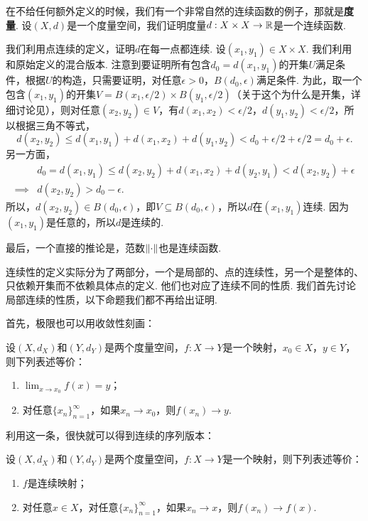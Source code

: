 \begin{example}\label{ex:metric-norm-continuous}
在不给任何额外定义的时候，我们有一个非常自然的连续函数的例子，那就是\textbf{度量}. 设$(X,d)$是一个度量空间，我们证明度量$d:X\times X\to\mathbb{R}$是一个连续函数. 

我们利用点连续的定义，证明$d$在每一点都连续. 设$(x_1,y_1)\in X\times X$. 我们利用 和原始定义的混合版本. 注意到要证明所有包含$d_0=d(x_1,y_1)$的开集$U$满足条件，根据$U$的构造，只需要证明，对任意$\epsilon>0$，$B(d_0,\epsilon)$满足条件. 为此，取一个包含$(x_1,y_1)$的开集$V=B(x_1,\epsilon/2)\times B(y_1,\epsilon/2)$（关于这个为什么是开集，详细讨论见），则对任意$(x_2,y_2)\in V$，有$d(x_1,x_2)<\epsilon/2$，$d(y_1,y_2)<\epsilon/2$，所以根据三角不等式，
\[d(x_2,y_2)\leq d(x_1,y_1)+d(x_1,x_2)+d(y_1,y_2)<d_0+\epsilon/2+\epsilon/2=d_0+\epsilon.\]
另一方面，
\begin{align*}
    &d_0=d(x_1,y_1)\leq d(x_2,y_2)+d(x_1,x_2)+d(y_2,y_1)<d(x_2,y_2)+\epsilon\\
\implies& d(x_2,y_2)>d_0-\epsilon.
\end{align*}
所以，$d(x_2,y_2)\in B(d_0,\epsilon)$，即$V\subseteq B(d_0,\epsilon)$，所以$d$在$(x_1,y_1)$连续. 因为$(x_1,y_1)$是任意的，所以$d$是连续的.

最后，一个直接的推论是，范数$\left\|\cdot\right\|$也是连续函数. 
\end{example}

连续性的定义实际分为了两部分，一个是局部的、点的连续性，另一个是整体的、只依赖开集而不依赖具体点的定义. 他们也对应了连续不同的性质. 我们首先讨论局部连续的性质，以下命题我们都不再给出证明. 

首先，极限也可以用收敛性刻画：

\begin{proposition}\label{prop:limit-converge}
    设$(X,d_X)$和$(Y,d_Y)$是两个度量空间，$f:X\to Y$是一个映射，$x_0\in X$，$y\in Y$，则下列表述等价：
    \begin{enumerate}
        \item $\lim_{x\to x_0}f(x)=y$；
        \item 对任意$\{x_n\}_{n=1}^\infty$，如果$x_n\to x_0$，则$f(x_n)\to y$.
    \end{enumerate}
\end{proposition}

利用这一条，很快就可以得到连续的序列版本：

\begin{corollary}\label{cor:continuous-converge}
    设$(X,d_X)$和$(Y,d_Y)$是两个度量空间，$f:X\to Y$是一个映射，则下列表述等价：
    \begin{enumerate}
        \item $f$是连续映射；
        \item 对任意$x\in X$，对任意$\{x_n\}_{n=1}^\infty$，如果$x_n\to x$，则$f(x_n)\to f(x)$.
    \end{enumerate}
\end{corollary}

